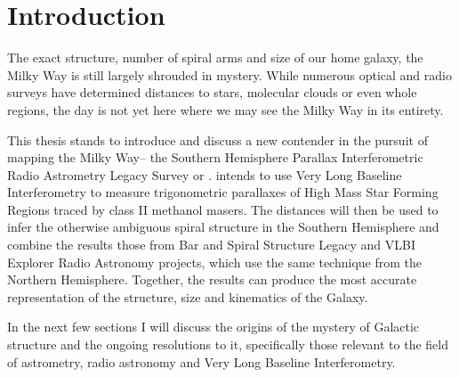 
\chapter{Introduction}
    {\onehalfspacing    
    \vspace{4cm}
    The exact structure, number of spiral arms and size of our home galaxy, the Milky Way is still largely shrouded in mystery. While numerous optical and radio surveys have determined distances to stars, molecular clouds or even whole regions, the day is not yet here where we may see the Milky Way in its entirety.
    
    This thesis stands to introduce and discuss a new contender in the pursuit of mapping the Milky Way-- the Southern Hemisphere Parallax Interferometric Radio Astrometry Legacy Survey or \spirals. \spirals\space intends to use Very Long Baseline Interferometry to measure trigonometric parallaxes of High Mass Star Forming Regions traced by class II methanol masers. The distances will then be used to infer the otherwise ambiguous spiral structure in the Southern Hemisphere and combine the results those from Bar and Spiral Structure Legacy and VLBI Explorer Radio Astronomy projects, which use the same technique from the Northern Hemisphere. Together, the results can produce the most accurate representation of the structure, size and kinematics of the Galaxy.
    
    In the next few sections I will discuss the origins of the mystery of Galactic structure and the ongoing resolutions to it, specifically those relevant to the field of astrometry, radio astronomy and Very Long Baseline Interferometry.
    
    }
    
    \newpage
